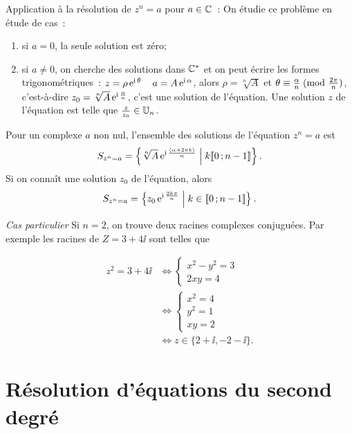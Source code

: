 Application à la résolution de \(z^n = a\) pour \(a \in{}\mathbb{C}\)~: On étudie ce 
problème en étude de cas~:
\begin{enumerate}
  \item si \(a = 0\), la seule solution est zéro;
  \item si \(a \neq 0\), on cherche des solutions dans \(\mathbb{C}^*\) et on peut 
    écrire les formes trigonométriques~: \(z = \rho \operatorname{e}^{\operatorname{i} \theta} \quad a = 
    A \operatorname{e}^{\operatorname{i} \alpha}\), alors \(\rho = \sqrt[n]{A}\) et 
    \(\theta \equiv \frac{\alpha}{n}\!\pmod {\frac{2\pi}{n}}\), c'est-à-dire 
    \(z_0 = \sqrt[n]{A}  \operatorname{e}^{\operatorname{i} \frac{\alpha}{n}}\), c'est une solution de 
    l'équation. Une solution \(z\) de l'équation est telle que 
    \(\frac{z}{z_0} \in{}\mathbb{U}_n\).
\end{enumerate}

\begin{prop}
  Pour un complexe \(a\) non nul, l'ensemble des solutions de l'équation \(z^n 
  = a\) est
  \begin{equation}
    S_{z^n = a} = \left\{\sqrt[n]{A} \operatorname{e}^{\operatorname{i} \frac{(\alpha + 2\pi k)}{n}}\mathrel{}\middle|\mathrel{}k 
    \mathopen{\llbracket}0\mathclose{}\mathpunct{};n-1\mathclose{\rrbracket}\right\}.
  \end{equation}
  Si on connaît une solution \(z_0\) de l'équation, alors
  \begin{equation}
    S_{z^n = a} = \left\{z_0 \operatorname{e}^{\operatorname{i} \frac{2 k \pi}{n}}\mathrel{}\middle|\mathrel{}k \in{}
    \mathopen{\llbracket}0\mathclose{}\mathpunct{};n-1\mathclose{\rrbracket}\right\}.
  \end{equation}
\end{prop}

\emph{Cas particulier}
Si \(n = 2\), on trouve deux racines complexes conjuguées. Par exemple les 
racines de \(Z = 3 + 4\ii\) sont telles que

\begin{align*}
  z^2 = 3 + 4\ii{}& \iff  \begin{cases} x^2-y^2 = 3 \\ 2xy = 4 \end{cases} \\
    & \iff \begin{cases} x^2 = 4 \\ y^2 = 1 \\ xy = 2 \end{cases} \\
      & \iff z \in{}\{2 + \ii, -2-\ii\}.
\end{align*}

\section{Résolution d'équations du second degré}
\label{sec:resolutionequationseconddegre}

